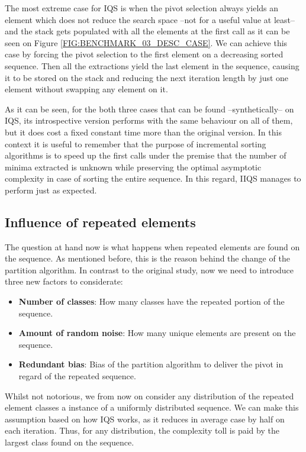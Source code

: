 The most extreme case for IQS is when the pivot selection always yields an element which does not reduce the search space --not for a useful value at least-- and the stack gets populated with all the elements at the first call as it can be seen on Figure \ref{FIG:BENCHMARK_03_DESC_CASE}. We can achieve this case by forcing the pivot selection to the first element on a decreasing sorted sequence. Then all the extractions yield the last element in the sequence, causing it to be stored on the stack and reducing the next iteration length by just one element without swapping any element on it.

As it can be seen, for the both three cases that can be found --synthetically-- on IQS, its introspective version performs with the same behaviour on all of them, but it does cost a fixed constant time more than the original version. In this context it is useful to remember that the purpose of incremental sorting algorithms is to speed up the first calls under the premise that the number of minima extracted is unknown while preserving the optimal asymptotic complexity in case of sorting the entire sequence. In this regard, IIQS manages to perform just as expected.

\subsection{Influence of repeated elements}

The question at hand now is what happens when repeated elements are found on the sequence. As mentioned before, this is the reason behind the change of the partition algorithm. In contrast to the original study, now we need to introduce three new factors to considerate:

\begin{itemize}
    \item \textbf{Number of classes}: How many classes have the repeated portion of the sequence.
    \item \textbf{Amount of random noise}: How many unique elements are present on the sequence.
    \item \textbf{Redundant bias}: Bias of the partition algorithm to deliver the pivot in regard of the repeated sequence.
\end{itemize}

Whilst not notorious, we from now on consider any distribution of the repeated element classes a instance of a uniformly distributed sequence. We can make this assumption based on how IQS works, as it reduces in average case by half on each iteration. Thus, for any distribution, the complexity toll is paid by the largest class found on the sequence.

